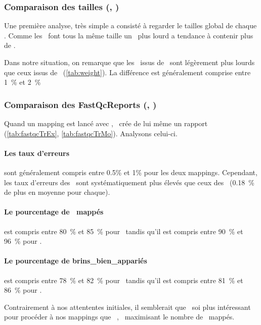 \documentclass[../main]{subfiles} %
\begin{document}
\subsubsection{Comparaison des tailles (\BamTrEx, \BamTrMo)}
Une première analyse, très simple a consisté à regarder le tailles global de chaque \bam. Comme les \reads font tous la même taille un \bam plus lourd a tendance à contenir plus de \reads.






Dans notre situation, on remarque que les \bam issus de \TrMo sont légèrement plus lourds que ceux issus de \TrEx (\cref{tab:weight}). La différence est généralement comprise entre 1 \% et 2 \%


\subsubsection{Comparaison des FastQcReports (\BamTrEx, \BamTrMo)}
\label{sec:fastqc}
Quand un \gls{mapping} est lancé avec \GeCKO, \GeCKO crée de lui même un rapport \fastqc (\cref{tab:fastqcTrEx}, \cref{tab:fastqcTrMo}). Analysons celui-ci.







\paragraph{Les taux d'erreurs} sont généralement compris entre 0.5\% et 1\% pour les deux \glspl{mapping}. Cependant, les taux d'erreurs des \BamTrMo sont systématiquement plus élevés que ceux des \BamTrEx (0.18 \% de plus en moyenne pour chaque). 

\paragraph{Le pourcentage de \reads mappés} est compris entre 80 \% et 85 \% pour \TrMo tandis qu'il est compris entre 90 \% et 96 \% pour \TrEx.

\paragraph{Le pourcentage de \gls{brins_bien_appariés}} est compris entre 78 \% et 82 \% pour \TrMo tandis qu'il est compris entre 81 \% et 86 \% pour \TrEx.

Contrairement à nos attententes initiales, il semblerait que \TrEx soi plus intéressant pour procéder à nos \glspl{mapping} que \TrMo , \TrEx maximisant le nombre de \reads mappés.
\end{document}
